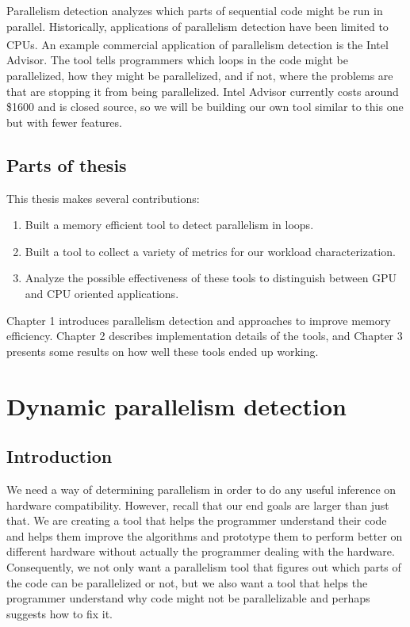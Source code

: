 \documentclass[12pt,twoside]{reedthesis}
\begin{document}
		Parallelism detection analyzes which parts of sequential code might be run in parallel. Historically, applications of parallelism detection have been limited to CPUs. 
		An example commercial application of parallelism detection is the  Intel\textsuperscript{\textregistered} Advisor. The tool tells programmers which loops in the code might be parallelized, how they might be parallelized, and if not, where the problems are that are stopping it from being parallelized. 
		Intel Advisor currently costs around \$1600 and is closed source, so we will be building our own tool similar to this one but with fewer features. 
		
	
	\section{Parts of thesis}
	
		This thesis makes several contributions:
		
		\begin{enumerate}
			\item Built a memory efficient tool to detect parallelism in loops. 
			\item Built a tool to collect a variety of metrics for our workload characterization. %
			\item Analyze the possible effectiveness of these tools to distinguish between GPU and CPU oriented applications.
		\end{enumerate}
	
		Chapter 1 introduces parallelism detection and approaches to improve memory efficiency. Chapter 2 describes implementation details of the tools, and Chapter 3 presents some results on how well these tools ended up working. 
	
		
\chapter{Dynamic parallelism detection}

	\section{Introduction}
	
		We need a way of determining parallelism in order to do any useful inference on hardware compatibility. However, recall that our end goals are larger than just that. We are creating a tool that helps the programmer understand their code and helps them improve the algorithms and prototype them to perform better on different hardware without actually the programmer dealing with the hardware. Consequently, we not only want a parallelism tool that figures out which parts of the code can be parallelized or not, but we also want a tool that helps the programmer understand why code might not be parallelizable and perhaps suggests how to fix it. 
		 
\end{document}
